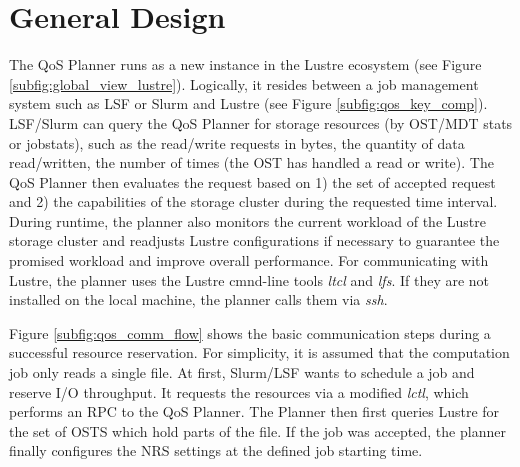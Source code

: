\documentclass[10pt]{article}
\begin{document}
\section{General Design}
\label{sect:general_design}
%
The QoS Planner runs as a new instance in the Lustre ecosystem (see Figure \ref{subfig:global_view_lustre}).
Logically, it resides between a job management system such as LSF or Slurm and Lustre (see Figure \ref{subfig:qos_key_comp}).
LSF/Slurm can query the QoS Planner for storage resources (by OST/MDT stats or jobstats), such as the read/write requests in bytes, the quantity of data read/written, the number of times (the OST has handled a read or write).
The QoS Planner then evaluates the request based on 1) the set of accepted request and 2) the capabilities of the storage cluster during the requested time interval. 
During runtime, the planner also monitors the current workload of the Lustre storage cluster and readjusts Lustre configurations if necessary to guarantee the promised workload and improve overall performance.
For communicating with Lustre, the planner uses the Lustre cmnd-line tools \emph{ltcl} and \emph{lfs}. 
If they are not installed on the local machine, the planner calls them via \emph{ssh}.

Figure \ref{subfig:qos_comm_flow} shows the basic communication steps during a successful resource reservation.
For simplicity, it is assumed that the computation job only reads a single file.
At first, Slurm/LSF wants to schedule a job and reserve I/O throughput.
It requests the resources via a modified \emph{lctl}, which performs an RPC to the QoS Planner.
The Planner then first queries Lustre for the set of OSTS which hold parts of the file.
If the job was accepted, the planner finally configures the NRS settings at the defined job starting time.

\end{document}
